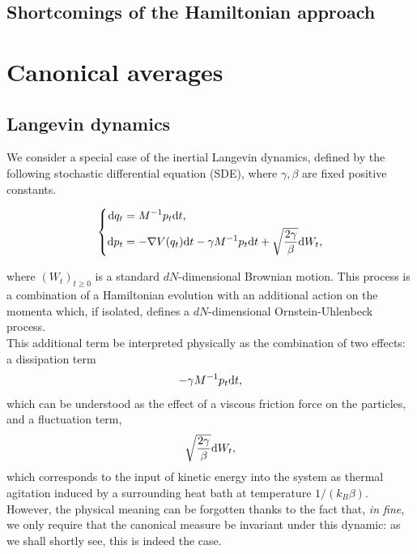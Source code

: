     \subsection{Shortcomings of the Hamiltonian approach}

\section{Canonical averages}

\subsection{Langevin dynamics}
We consider a special case of the inertial Langevin dynamics, defined by the following stochastic differential equation (SDE), where $\gamma, \beta$ are fixed positive constants.

\begin{equation}
    \label{eq:langevin}
    \left\{\begin{aligned}
        \text dq_t&=M^{-1}p_t\mathrm{d}t,\\
        \text dp_t&= -\nabla V(q_t)\mathrm{d}t -\gamma M^{-1}p_t\mathrm{d}t+\sqrt{\frac{2\gamma}\beta}\text dW_t,
    \end{aligned}\right.
\end{equation}

where $(W_t)_{t\geq 0}$ is a standard $dN$-dimensional Brownian motion.
This process is a combination of a Hamiltonian evolution with an additional action on the momenta which, if isolated, defines a $dN$-dimensional Ornstein-Uhlenbeck process.\\
This additional term be interpreted physically as the combination of two effects: a dissipation term 
$$-\gamma M^{-1}p_t\mathrm{d}t,$$
which can be understood as the effect of a viscous friction force on the particles, and a fluctuation term, 
$$\sqrt{\frac{2\gamma}\beta}\text dW_t,$$
which corresponds to the input of kinetic energy into the system as thermal agitation induced by a surrounding heat bath at temperature $1/(k_B\beta)$.\\
However, the physical meaning can be forgotten thanks to the fact that, \textit{in fine}, we only require that the canonical measure be invariant under this dynamic: as we shall shortly see, this is indeed the case.

